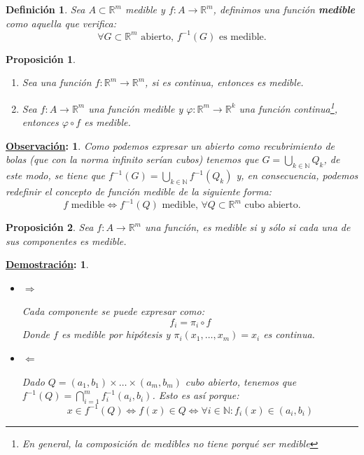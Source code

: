 \documentclass[10pt,a4paper,openright]{book}
\theoremstyle{break}
\newtheorem*{defi}{Definición}
\newtheorem*{prop}{Proposición}
\newtheorem*{demo}{\underline{Demostración}:}
\newtheorem*{obs}{\underline{Observación}:}
\begin{document}
\begin{defi}
Sea $A \subset \mathbb{R}^m$ medible y $f: A \rightarrow \mathbb{R}^m$, definimos una función \textbf{medible} como aquella que verifica:
$$\forall G \subset \mathbb{R}^m \text{ abierto, } f^{-1}(G) \text{ es medible}.$$ 
\end{defi}

\begin{prop}
\begin{enumerate}
\item Sea una función $f: \mathbb{R}^m \rightarrow \mathbb{R}^m$, si es continua, entonces es medible.

\item Sea $f: A \rightarrow \mathbb{R}^m$ una función medible y $\varphi: \mathbb{R}^m \rightarrow \mathbb{R}^k$ una función continua\footnote{En general, la composición de medibles no tiene porqué ser medible}, entonces $\varphi \circ f$ es medible.
\end{enumerate}
\end{prop}

\begin{obs}
Como podemos expresar un abierto como recubrimiento de bolas (que con la norma infinito serían cubos) tenemos que $G = \bigcup_{k \in \mathbb{N}} Q_k$, de este modo, se tiene que $f^{-1}\left( G \right) = \bigcup_{k \in \mathbb{N}}f^{-1}\left( Q_k \right)$ y, en consecuencia, podemos redefinir el concepto de función medible de la siguiente forma:
$$f \text{ medible} \Leftrightarrow f^{-1}\left( Q \right) \text{ medible, } \forall Q \subset \mathbb{R}^m \text{ cubo abierto.}$$
\end{obs}


\begin{prop}
Sea $f: A \rightarrow \mathbb{R}^m$ una función, es medible si y sólo si cada una de sus componentes es medible.
\end{prop}
\begin{demo}
\begin{itemize}
\item $\Rightarrow$

Cada componente se puede expresar como:
$$f_i = \pi_i \circ f$$
Donde $f$ es medible por hipótesis y $\pi_i\left( x_1, \ldots, x_m \right) = x_i$ es continua.

\item $\Leftarrow$

Dado $Q = \left( a_1, b_1 \right) \times \ldots \times \left( a_m, b_m \right)$ cubo abierto, tenemos que $f^{-1}\left( Q \right) = \bigcap_{i = 1}^{m} f_i^{-1}\left( a_i, b_i \right)$. Esto es así porque:
$$x \in f^{-1}\left( Q \right) \Leftrightarrow f\left( x \right) \in Q \Leftrightarrow \forall i \in \mathbb{N} : f_i\left( x \right) \in \left( a_i, b_i \right)$$
\end{itemize}
\end{demo}
\end{document}
